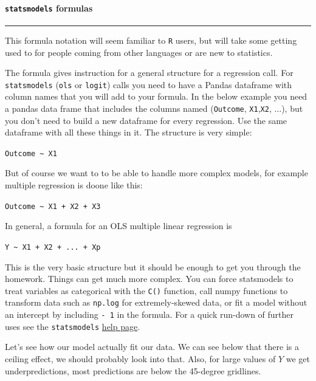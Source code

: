 \documentclass[11pt]{article}
\begin{document}
    \paragraph{\texorpdfstring{\texttt{statsmodels}
formulas}{statsmodels formulas}}\label{statsmodels-formulas}

\begin{center}\rule{0.5\linewidth}{\linethickness}\end{center}

This formula notation will seem familiar to \texttt{R} users, but will
take some getting used to for people coming from other languages or are
new to statistics.

The formula gives instruction for a general structure for a regression
call. For \texttt{statsmodels} (\texttt{ols} or \texttt{logit}) calls
you need to have a Pandas dataframe with column names that you will add
to your formula. In the below example you need a pandas data frame that
includes the columns named (\texttt{Outcome}, \texttt{X1},\texttt{X2},
...), but you don't need to build a new dataframe for every regression.
Use the same dataframe with all these things in it. The structure is
very simple:

\texttt{Outcome\ \textasciitilde{}\ X1}

But of course we want to to be able to handle more complex models, for
example multiple regression is doone like this:

\texttt{Outcome\ \textasciitilde{}\ X1\ +\ X2\ +\ X3}

In general, a formula for an OLS multiple linear regression is

\texttt{Y\ \textasciitilde{}\ X1\ +\ X2\ +\ ...\ +\ Xp}

This is the very basic structure but it should be enough to get you
through the homework. Things can get much more complex. You can force
statsmodels to treat variables as categorical with the \texttt{C()}
function, call numpy functions to transform data such as \texttt{np.log}
for extremely-skewed data, or fit a model without an intercept by
including \texttt{-\ 1} in the formula. For a quick run-down of further
uses see the \texttt{statsmodels}
\href{http://statsmodels.sourceforge.net/devel/example_formulas.html}{help
page}.

    Let's see how our model actually fit our data. We can see below that
there is a ceiling effect, we should probably look into that. Also, for
large values of \(Y\) we get underpredictions, most predictions are
below the 45-degree gridlines.
\end{document}
